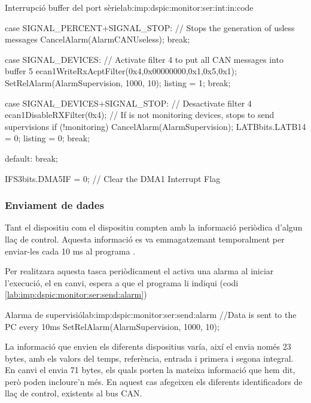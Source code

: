 \begin{code_c}{Interrupció buffer del port sèrie}{lab:imp:dspic:monitor:ser:int:in:code}
{{	case SIGNAL_PERCENT+SIGNAL_STOP:
		// Stops the generation of usless messages
		CancelAlarm(AlarmCANUseless);
		break;

	case SIGNAL_DEVICES:
		// Activate filter 4 to put all CAN messages into buffer 5
		ecan1WriteRxAcptFilter(0x4,0x00000000,0x1,0x5,0x1);
		SetRelAlarm(AlarmSupervision, 1000, 10);
		listing = 1;
		break;

	case SIGNAL_DEVICES+SIGNAL_STOP:
		// Desactivate filter 4
		ecan1DisableRXFilter(0x4);
		// If is not monitoring devices, stops to send supervisions
		if (!monitoring) CancelAlarm(AlarmSupervision);
		LATBbits.LATB14 = 0;
		listing = 0;
		break;

	default:
		break;
	}

	IFS3bits.DMA5IF = 0; // Clear the DMA1 Interrupt Flag
}
\end{code_c}

\subsubsection{Enviament de dades}\label{lab:imp:dspic:monitor:ser:send}

Tant el dispositiu \Monitor com el dispositiu \SensorActuador compten amb la informació periòdica d'algun llaç de control. Aquesta informació es va emmagatzemant temporalment per enviar-les cada 10 ms al programa \DCSMonitor.

Per realitzara aquesta tasca periòdicament el \SensorActuador activa una alarma al iniciar l'execució, el \Monitor en canvi, espera a que el programa \DCSMonitor li indiqui (codi \ref{lab:imp:dspic:monitor:ser:send:alarm})

\begin{code_c}{Alarma de supervisió}{lab:imp:dspic:monitor:ser:send:alarm}
//Data is sent to the PC every 10ms
SetRelAlarm(AlarmSupervision, 1000, 10);
\end{code_c}

La informació que envien els diferents dispositius varía, així el \SensorActuador envia només 23 bytes, amb els valors del temps, referència, entrada i primera i segona integral. En canvi el \Monitor envia 71 bytes, els quals porten la mateixa informació que hem dit, però poden incloure'n més. En aquest cas afegeixen els diferents identificadors de llaç de control, existents al bus CAN.

